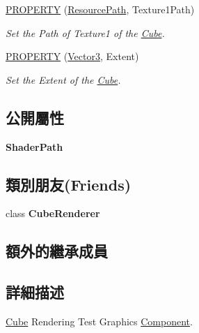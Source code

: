 \begin{DoxyCompactItemize}
\hyperlink{class_magnum_1_1_cube_a910958611d39345c927012491c4e05ae}{P\+R\+O\+P\+E\+R\+TY} (\hyperlink{class_magnum_1_1_resource_path}{Resource\+Path}, Texture1\+Path)
\begin{DoxyCompactList}\small\item\em Set the Path of Texture1 of the \hyperlink{class_magnum_1_1_cube}{Cube}. \end{DoxyCompactList}\item 
\hyperlink{class_magnum_1_1_cube_a74b9d5838eb5d01121539f4adad23012}{P\+R\+O\+P\+E\+R\+TY} (\hyperlink{class_magnum_1_1_vector3}{Vector3}, Extent)
\begin{DoxyCompactList}\small\item\em Set the Extent of the \hyperlink{class_magnum_1_1_cube}{Cube}. \end{DoxyCompactList}\end{DoxyCompactItemize}
\subsection*{公開屬性}
\begin{DoxyCompactItemize}
\item 
{\bfseries Shader\+Path}\hypertarget{class_magnum_1_1_cube_a7190d930ab26b637e666af179ff1456f}{}\label{class_magnum_1_1_cube_a7190d930ab26b637e666af179ff1456f}

\end{DoxyCompactItemize}
\subsection*{類別朋友(Friends)}
\begin{DoxyCompactItemize}
\item 
class {\bfseries Cube\+Renderer}\hypertarget{class_magnum_1_1_cube_a3d589914207ae47e065e1ec40ce522fc}{}\label{class_magnum_1_1_cube_a3d589914207ae47e065e1ec40ce522fc}

\end{DoxyCompactItemize}
\subsection*{額外的繼承成員}


\subsection{詳細描述}
\hyperlink{class_magnum_1_1_cube}{Cube} Rendering Test Graphics \hyperlink{class_magnum_1_1_component}{Component}. 

